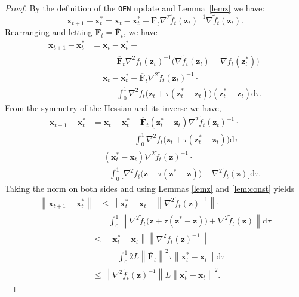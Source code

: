 \documentclass[journal,twoside,web]{ieeecolor}
\newcommand{\norm}[1]{\left\lVert#1\right\rVert}
\newcommand{\xx}{\mathbf{x}}
\newcommand{\zz}{\mathbf{z}}
\newcommand{\FF}{\mathbf{F}}
\newcommand{\FFo}{\overline{\FF}_t}
\begin{document}
\begin{proof}
By the definition of the \texttt{OEN} update and Lemma~\ref{lemz} we have:
\[\xx_{t+1}-\xx_t^* = \xx_t-\xx_t^*-\FF_t\nabla^2\tilde{f}_t(\zz_t)^{-1}\nabla\tilde{f}_t(\zz_t).\]
Rearranging and letting $\FF_t=\FFo$, we have
\begin{align*}
    \xx_{t+1}-\xx_t^* &= \xx_t-\xx_t^*-\\
    &\quad\quad\quad\FFo\nabla^2\tilde{f}_t(\zz_t)^{-1}\big(\nabla\tilde{f}_t(\zz_t)-\nabla\tilde{f}_t(\zz_t^*)\big)\\
    &= \xx_t-\xx_t^*-\FFo\nabla^2\tilde{f}_t(\zz_t)^{-1}\cdot\\
    &\quad\quad\quad\int_0^1\nabla^2\tilde{f}_t\big(\zz_t+\tau(\zz_t^*-\zz_t)\big)(\zz_t^*-\zz_t)\text{d}\tau.
\end{align*}
From the symmetry of the Hessian and its inverse we have,
\begin{align*}
    \xx_{t+1}-\xx_t^* &= \xx_t-\xx_t^*-\FFo(\zz_t^*-\zz_t)\nabla^2\tilde{f}_t(\zz_t)^{-1}\cdot\\
    &\quad\quad\quad\quad\quad\int_0^1\nabla^2\tilde{f}_t\big(\zz_t+\tau(\zz_t^*-\zz_t)\big)\text{d}\tau\\
    &= (\xx_t^*-\xx_t)\nabla^2\tilde{f}_t(\zz)^{-1}\cdot\\
    &\quad\quad\int_0^1\Big[\nabla^2\tilde{f}_t\big(\zz+\tau(\zz^*-\zz)\big)-\nabla^2\tilde{f}_t(\zz)\Big]\text{d}\tau.
\end{align*}
Taking the norm on both sides and using Lemmas \ref{lemz} and \ref{lem:const} yields
\begin{align*}
    \norm{ \xx_{t+1}-\xx_t^*} &\le \norm{\xx_t^*-\xx_t}\norm{\nabla^2\tilde{f}_t(\zz)^{-1}}\mathbf{\cdot}\nonumber\\
    &\quad\int_0^1\norm{\nabla^2\tilde{f}_t\big(\zz+\tau(\zz^*-\zz)\big)+\nabla^2\tilde{f}_t(\zz)}\text{d}\tau\nonumber
    \end{align*}
    \begin{align}
    &\le \norm{\xx_t^*-\xx_t}\norm{\nabla^2\tilde{f}_t(\zz)^{-1}}\nonumber\\
    &\quad\quad\quad\int_0^1 2L\norm{\FFo}^2\tau\norm{\xx_t^*-\xx_t}\text{d}\tau\nonumber\\
    &\le \norm{\nabla^2\tilde{f}_t(\zz)^{-1}}L\norm{\xx_t^*-\xx_t}^2.

\end{align}
\end{proof}
\end{document}
